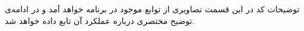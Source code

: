 \Problem
{توضیحات کد}
{
در این قسمت تصاویری از توابع موجود در برنامه خواهد آمد و در ادامه‌ی توضیح مختصری درباره عملکرد آن تابع داده خواهد شد.
}
